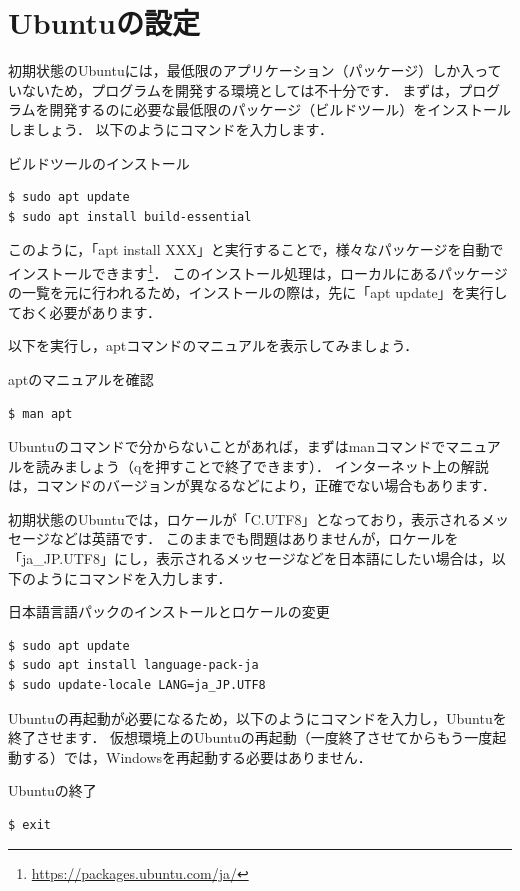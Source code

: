 \documentclass[dvipdfmx]{jarticle}
\begin{document}
\section{Ubuntuの設定}

初期状態のUbuntuには，最低限のアプリケーション（パッケージ）しか入っていないため，プログラムを開発する環境としては不十分です．
まずは，プログラムを開発するのに必要な最低限のパッケージ（ビルドツール）をインストールしましょう．
以下のようにコマンドを入力します．
\begin{itembox}[l]{ビルドツールのインストール}
\begin{verbatim}
$ sudo apt update
$ sudo apt install build-essential
\end{verbatim}
\end{itembox}
このように，「apt install XXX」と実行することで，様々なパッケージを自動でインストールできます\footnote{\url{https://packages.ubuntu.com/ja/}}．
このインストール処理は，ローカルにあるパッケージの一覧を元に行われるため，インストールの際は，先に「apt update」を実行しておく必要があります．

以下を実行し，aptコマンドのマニュアルを表示してみましょう．
\begin{itembox}[l]{aptのマニュアルを確認}
\begin{verbatim}
$ man apt
\end{verbatim}
\end{itembox}
Ubuntuのコマンドで分からないことがあれば，まずはmanコマンドでマニュアルを読みましょう（qを押すことで終了できます）．
インターネット上の解説は，コマンドのバージョンが異なるなどにより，正確でない場合もあります．

初期状態のUbuntuでは，ロケールが「C.UTF8」となっており，表示されるメッセージなどは英語です．
このままでも問題はありませんが，ロケールを「ja\_JP.UTF8」にし，表示されるメッセージなどを日本語にしたい場合は，以下のようにコマンドを入力します．
\begin{itembox}[l]{日本語言語パックのインストールとロケールの変更}
\begin{verbatim}
$ sudo apt update
$ sudo apt install language-pack-ja
$ sudo update-locale LANG=ja_JP.UTF8
\end{verbatim}
\end{itembox}
Ubuntuの再起動が必要になるため，以下のようにコマンドを入力し，Ubuntuを終了させます．
仮想環境上のUbuntuの再起動（一度終了させてからもう一度起動する）では，Windowsを再起動する必要はありません．
\begin{itembox}[l]{Ubuntuの終了}
\begin{verbatim}
$ exit
\end{verbatim}
\end{itembox}
\end{document}
